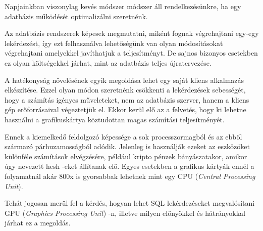 
Napjainkban viszonylag kevés módszer módszer áll rendelkezésünkre, ha egy adatbázis működését optimalizálni szeretnénk.

Az adatbázis rendszerek képesek megmutatni, miként fognak végrehajtani egy-egy lekérdezést, így ezt felhasználva lehetőségünk van olyan módosításokat végrehajtani amelyekkel javíthatjuk a teljesítményt. De sajnos bizonyos esetekben ez olyan költségekkel járhat, mint az adatbázis teljes újratervezése.

A hatékonyság növelésének egyik megoldása lehet egy saját kliens alkalmazás elkészítése. Ezzel olyan módon szeretnénk csökkenti a lekérdezések sebességét, hogy a számítás igényes műveleteket, nem az adatbázis szerver, hanem a kliens gép erőforrásaival végeztetjük el. Ekkor kerül elő az a felvetés, hogy ki lehetne használni a grafikuskártya köztudottan magas számítási teljesítményét.

Ennek a kiemelkedő feldolgozó képessége a sok processzormagból és az ebből származó párhuzamosságból adódik. Jelenleg is használják ezeket az eszközöket különféle számítások elvégzésére, például kripto pénzek bányászatakor, amikor úgy nevezett hesh -eket állítanak elő. Egyes esetekben a grafikus kártyák ennél a folyamatnál akár 800x is gyorsabbak lehetnek mint egy CPU (\textit{Central Processing Unit}). \cite{crypto}

Tehát jogosan merül fel a kérdés, hogyan lehet SQL lekérdezéseket megvalósítani GPU (\textit{Graphics Processing Unit}) -n, illetve milyen előnyökkel és hátrányokkal járhat ez a megoldás.











